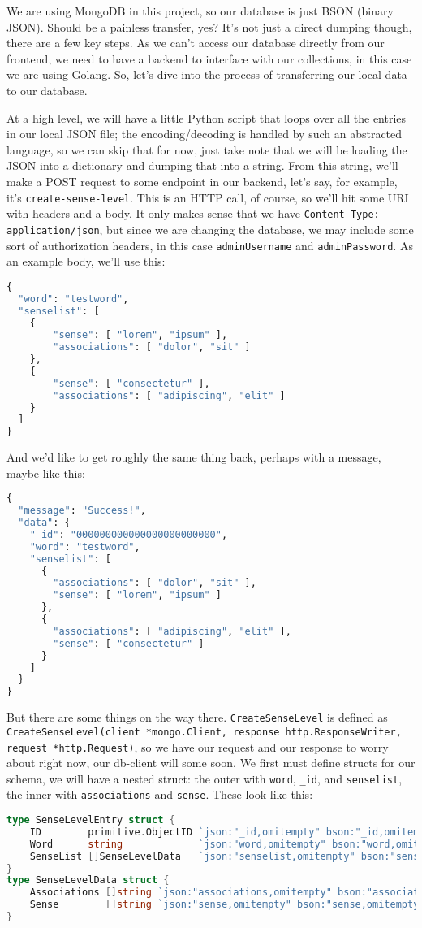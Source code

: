 \documentclass[11pt, twoside, reqno]{book}
\begin{document}
We are using MongoDB in this project, so our database is just BSON (binary JSON). Should be a painless transfer, yes? It's not just a direct dumping though, there are a few key steps. As we can't access our database directly from our frontend, we need to have a backend to interface with our collections, in this case we are using Golang. So, let's dive into the process of transferring our local data to our database.

At a high level, we will have a little Python script that loops over all the entries in our local JSON file; the encoding/decoding is handled by such an abstracted language, so we can skip that for now, just take note that we will be loading the JSON into a dictionary and dumping that into a string. From this string, we'll make a POST request to some endpoint in our backend, let's say, for example, it's  \texttt{create-sense-level}. This is an HTTP call, of course, so we'll hit some URI with headers and a body. It only makes sense that we have \texttt{Content-Type: application/json}, but since we are changing the database, we may include some sort of authorization headers, in this case \texttt{adminUsername} and \texttt{adminPassword}. As an example body, we'll use this:
\begin{lstlisting}[language=Python]
{
  "word": "testword",
  "senselist": [
  	{
  		"sense": [ "lorem", "ipsum" ],
  		"associations": [ "dolor", "sit" ]
  	},
  	{
  		"sense": [ "consectetur" ],
  		"associations": [ "adipiscing", "elit" ]
  	}
  ]
}
\end{lstlisting}

And we'd like to get roughly the same thing back, perhaps with a message, maybe like this:
\begin{lstlisting}[language=Python]
{
  "message": "Success!",
  "data": {
    "_id": "000000000000000000000000",
    "word": "testword",
    "senselist": [
      {
        "associations": [ "dolor", "sit" ],
        "sense": [ "lorem", "ipsum" ]
      },
      {
        "associations": [ "adipiscing", "elit" ],
        "sense": [ "consectetur" ]
      }
    ]
  }
}
\end{lstlisting}

But there are some things on the way there. \texttt{CreateSenseLevel} is defined as \texttt{CreateSenseLevel(client *mongo.Client, response http.ResponseWriter, request *http.Request)}, so we have our request and our response to worry about right now, our db-client will some soon. We first must define structs for our schema, we will have a nested struct: the outer with \texttt{word}, \texttt{\_id}, and \texttt{senselist}, the inner with \texttt{associations} and \texttt{sense}. These look like this:
\begin{lstlisting}[language=Go]
type SenseLevelEntry struct {
	ID        primitive.ObjectID `json:"_id,omitempty" bson:"_id,omitempty"`
	Word      string             `json:"word,omitempty" bson:"word,omitempty"`
	SenseList []SenseLevelData   `json:"senselist,omitempty" bson:"senselist,omitempty"`
}
type SenseLevelData struct {
	Associations []string `json:"associations,omitempty" bson:"associations,omitempty"`
	Sense        []string `json:"sense,omitempty" bson:"sense,omitempty"`
}
\end{lstlisting}
\end{document}
